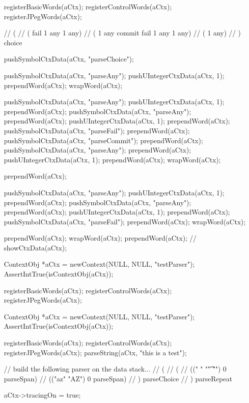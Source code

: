   registerBasicWords(aCtx);
  registerControlWords(aCtx);
  registerJPegWords(aCtx);

  // (
  //   ( fail 1 any 1 any)
  //   ( 1 any commit fail 1 any 1 any)
  //   ( 1 any)
  // ) choice

  pushSymbolCtxData(aCtx, "parseChoice");
  
  pushSymbolCtxData(aCtx, "parseAny");
  pushUIntegerCtxData(aCtx, 1);
  prependWord(aCtx);
  wrapWord(aCtx);
  
  pushSymbolCtxData(aCtx, "parseAny");
  pushUIntegerCtxData(aCtx, 1);
  prependWord(aCtx);
  pushSymbolCtxData(aCtx, "parseAny");
  prependWord(aCtx);
  pushUIntegerCtxData(aCtx, 1);
  prependWord(aCtx);
  pushSymbolCtxData(aCtx, "parseFail");
  prependWord(aCtx);
  pushSymbolCtxData(aCtx, "parseCommit");
  prependWord(aCtx);
  pushSymbolCtxData(aCtx, "parseAny");
  prependWord(aCtx);
  pushUIntegerCtxData(aCtx, 1);
  prependWord(aCtx);
  wrapWord(aCtx);
  
  prependWord(aCtx);
  
  pushSymbolCtxData(aCtx, "parseAny");
  pushUIntegerCtxData(aCtx, 1);
  prependWord(aCtx);
  pushSymbolCtxData(aCtx, "parseAny");
  prependWord(aCtx);
  pushUIntegerCtxData(aCtx, 1);
  prependWord(aCtx);
  pushSymbolCtxData(aCtx, "parseFail");
  prependWord(aCtx);
  wrapWord(aCtx);
  
  prependWord(aCtx);
  wrapWord(aCtx);
  prependWord(aCtx);
//  showCtxData(aCtx);
\stopCTest
\stopTestCase


\startCTest
  ContextObj *aCtx = newContext(NULL, NULL, "testParser");
  AssertIntTrue(isContextObj(aCtx));
  
  registerBasicWords(aCtx);
  registerControlWords(aCtx);
  registerJPegWords(aCtx);
\stopCTest
\stopTestCase

\startTestCase[should ??]

\startCTest
  ContextObj *aCtx = newContext(NULL, NULL, "testParser");
  AssertIntTrue(isContextObj(aCtx));
  
  registerBasicWords(aCtx);
  registerControlWords(aCtx);
  registerJPegWords(aCtx);
  parseString(aCtx, "this is a test");

  // build the following parser on the data stack...
  // ( 
  //   (
  //     ((" " "\t" "\n") 0 parseSpan)
  //     (("az" "AZ") 0 parseSpan)
  //   ) parseChoice
  // ) parseRepeat

  aCtx->tracingOn = true;

